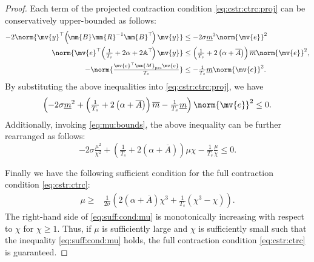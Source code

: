 \documentclass[lettersize,journal]{IEEEtran}
\begin{document}
\begin{proof}
   Each term of the projected contraction condition \eqref{eq:cstr:ctrc:proj} can be conservatively upper-bounded as follows:
   \begin{align}
      -2
      \norm{
         \mv{y}^\top 
         \!
         \left(
         \!
            \mm{B} 
            \mm{R}^{-1} 
            \mm{B}^\top
         \!
         \right)
         \mv{y}
      }
      &\le
      -2\sigma\underline{m}^2
      \norm{\mv{e}}^2
      \\
      \norm{
         \mv{e}^\top
         \!
         \left(
            \tfrac{1}{T_s}+2\alpha
            +
            2\mathbb{A}^\top
         \!
         \right)
         \mv{y}
      }
      &\le
      \left(
         \tfrac{1}{T_s}
         +
         2
         \left(
            \alpha
            +
            \overline{A}
         \right)
      \right)
      \overline{m}
      \norm{\mv{e}}^2
      ,
      \\
      -
      \norm{
         \tfrac{\mv{e}^\top \mm{M}_{\rm{pre}} \mv{e}}{T_s}
      }
      &\le
      -
      \tfrac{1}{T_s}\underline{m}
      \norm{\mv{e}}^2
      . 
   \end{align}
   By substituting the above inequalities into \eqref{eq:cstr:ctrc:proj}, we have
   \begin{equation}
      \left(
      -2\sigma\underline{m}^2
      +
      \left(
         \tfrac{1}{T_s}
         +
         2
         \left(
            \alpha
            +
            \overline{A}
         \right)
      \right)
      \overline{m}
      -\tfrac{1}{T_s}\underline{m}
      \right) 
      \norm{\mv{e}}^2
      \le 0
      .
   \end{equation}
   Additionally, invoking \eqref{eq:mu:bounds}, the above inequality can be further rearranged as follows:
   \begin{equation}
      -2\sigma \tfrac{\mu^2}{\chi^2}
      +
      \left(
         \tfrac{1}{T_s}
         +
         2
         \left(
            \alpha
            +
            \overline{A}
         \right)
      \right)
      \mu \chi
      -\tfrac{1}{T_s}\tfrac{\mu}{\chi}
      \le 0
      .
   \end{equation}
   
   Finally we have the following sufficient condition for the full contraction condition \eqref{eq:cstr:ctrc}:
   \begin{align} \label{eq:suff:cond:mu}
      \mu\ge
      &
      \tfrac{1}{2\sigma}
      \left(
         2(\alpha+\overline{A})\chi^3
         +
         \tfrac{1}{T_s}
         \left(
            \chi^3
            -
            \chi
         \right)
      \right)
      .
   \end{align}
   The right-hand side of \eqref{eq:suff:cond:mu} is monotonically increasing with respect to $\chi$ for $\chi\ge 1$.
   Thus, if $\mu$ is sufficiently large and $\chi$ is sufficiently small such that the inequality \eqref{eq:suff:cond:mu} holds, the full contraction condition \eqref{eq:cstr:ctrc} is guaranteed.

\end{proof}
\end{document}
